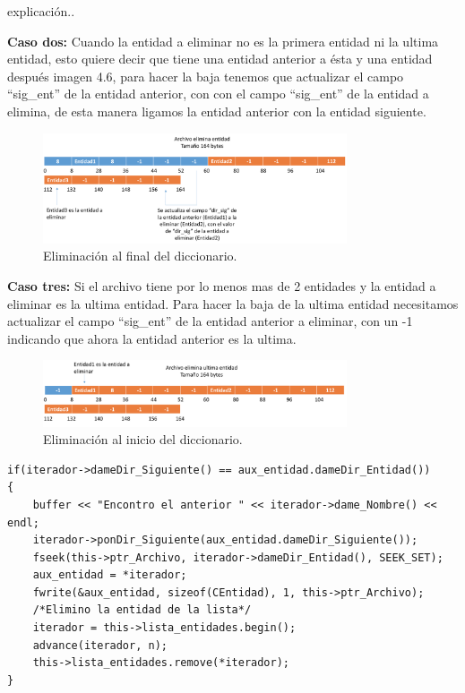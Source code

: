 explicación..

\newpage
{\bf Caso dos:} Cuando la entidad a eliminar no es la primera entidad ni la ultima entidad, esto quiere decir que tiene una entidad anterior a ésta y una entidad después imagen 4.6, para hacer la baja tenemos que actualizar el campo “sig\_ent” de la entidad anterior, con con el campo “sig\_ent” de la entidad a elimina, de esta manera ligamos la entidad anterior con la entidad siguiente.

\begin{figure}[!ht]
\begin{center}
  \includegraphics[width=0.8\textwidth]{secciones/ejemploA/Elimina2.png}
  \caption{Eliminación al final del diccionario.}
\end{center}
\end{figure}

{\bf Caso tres:} Si el archivo tiene por lo menos mas de 2 entidades y la entidad a eliminar es la ultima entidad. Para hacer la baja de la ultima entidad necesitamos actualizar el campo “sig\_ent” de la entidad anterior a eliminar, con un -1 indicando que ahora la entidad anterior es la ultima.
\begin{figure}[!ht]
\begin{center}
  \includegraphics[width=0.8\textwidth]{secciones/ejemploA/Elimina3.png}
  \caption{Eliminación al inicio del diccionario.}
\end{center}
\end{figure}

\begin{lstlisting}[frame=single]
if(iterador->dameDir_Siguiente() == aux_entidad.dameDir_Entidad())
{
	buffer << "Encontro el anterior " << iterador->dame_Nombre() << endl;
    iterador->ponDir_Siguiente(aux_entidad.dameDir_Siguiente());
    fseek(this->ptr_Archivo, iterador->dameDir_Entidad(), SEEK_SET);
    aux_entidad = *iterador;
    fwrite(&aux_entidad, sizeof(CEntidad), 1, this->ptr_Archivo);
    /*Elimino la entidad de la lista*/
    iterador = this->lista_entidades.begin();
    advance(iterador, n);
    this->lista_entidades.remove(*iterador);
}
\end{lstlisting}

